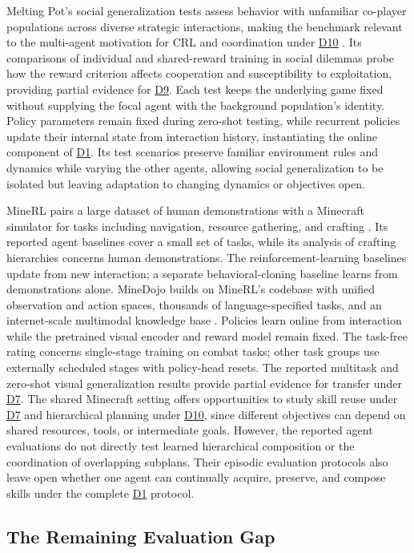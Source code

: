 \documentclass[10pt,journal,compsoc]{IEEEtran}
\DeclareRobustCommand{\Dref}[1]{\hyperref[sec:d#1]{D#1}}
\begin{document}
Melting Pot's social generalization tests assess behavior with unfamiliar co-player populations across diverse strategic interactions, making the benchmark relevant to the multi-agent motivation for CRL and coordination under \Dref{10} \cite{leibo2021}.
Its comparisons of individual and shared-reward training in social dilemmas probe how the reward criterion affects cooperation and susceptibility to exploitation, providing partial evidence for \Dref{9}.
Each test keeps the underlying game fixed without supplying the focal agent with the background population's identity.
Policy parameters remain fixed during zero-shot testing, while recurrent policies update their internal state from interaction history, instantiating the online component of \Dref{1}.
Its test scenarios preserve familiar environment rules and dynamics while varying the other agents, allowing social generalization to be isolated but leaving adaptation to changing dynamics or objectives open.

MineRL pairs a large dataset of human demonstrations with a Minecraft simulator for tasks including navigation, resource gathering, and crafting \cite{guss2019}.
Its reported agent baselines cover a small set of tasks, while its analysis of crafting hierarchies concerns human demonstrations.
The reinforcement-learning baselines update from new interaction; a separate behavioral-cloning baseline learns from demonstrations alone.
MineDojo builds on MineRL's codebase with unified observation and action spaces, thousands of language-specified tasks, and an internet-scale multimodal knowledge base \cite{fan2022}.
Policies learn online from interaction while the pretrained visual encoder and reward model remain fixed.
The task-free rating concerns single-stage training on combat tasks; other task groups use externally scheduled stages with policy-head resets.
The reported multitask and zero-shot visual generalization results provide partial evidence for transfer under \Dref{7}.
The shared Minecraft setting offers opportunities to study skill reuse under \Dref{7} and hierarchical planning under \Dref{10}, since different objectives can depend on shared resources, tools, or intermediate goals.
However, the reported agent evaluations do not directly test learned hierarchical composition or the coordination of overlapping subplans.
Their episodic evaluation protocols also leave open whether one agent can continually acquire, preserve, and compose skills under the complete \Dref{1} protocol.

\subsection{The Remaining Evaluation Gap}
\end{document}
